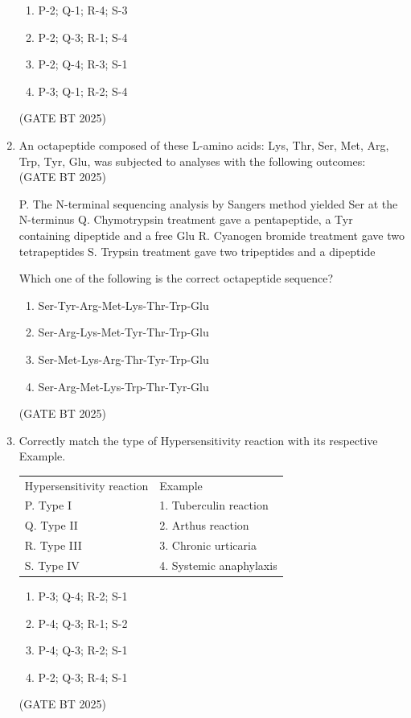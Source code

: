 \documentclass[journal,12pt,onecolumn]{IEEEtran}
\theoremstyle{remark}
\begin{document}
\begin{enumerate}
\begin{enumerate}
    \item P-2; Q-1; R-4; S-3
    \item P-2; Q-3; R-1; S-4
    \item P-2; Q-4; R-3; S-1
    \item P-3; Q-1; R-2; S-4
\end{enumerate}  
\hfill (GATE BT 2025)


\item An octapeptide composed of these L-amino acids: Lys, Thr, Ser, Met, Arg, Trp, Tyr, Glu, was subjected to analyses with the following outcomes:  
\hfill (GATE BT 2025)


P. The N-terminal sequencing analysis by Sangers method yielded Ser at the N-terminus  
Q. Chymotrypsin treatment gave a pentapeptide, a 
Tyr containing dipeptide and a free Glu  
R. Cyanogen bromide treatment gave two tetrapeptides  
S. Trypsin treatment gave two tripeptides and a dipeptide  

Which one of the following is the correct octapeptide sequence?  

\begin{enumerate}
    \item Ser-Tyr-Arg-Met-Lys-Thr-Trp-Glu
    \item Ser-Arg-Lys-Met-Tyr-Thr-Trp-Glu
    \item Ser-Met-Lys-Arg-Thr-Tyr-Trp-Glu
    \item Ser-Arg-Met-Lys-Trp-Thr-Tyr-Glu
\end{enumerate}  
\hfill (GATE BT 2025)

\item Correctly match the type of Hypersensitivity reaction with its respective Example.  

\begin{tabular}{ll}
Hypersensitivity reaction & Example \\
P. Type I & 1. Tuberculin reaction \\
Q. Type II & 2. Arthus reaction \\
R. Type III & 3. Chronic urticaria \\
S. Type IV & 4. Systemic anaphylaxis
\end{tabular}  

\begin{enumerate}
    \item P-3; Q-4; R-2; S-1
    \item P-4; Q-3; R-1; S-2
    \item P-4; Q-3; R-2; S-1
    \item P-2; Q-3; R-4; S-1
\end{enumerate}  
\hfill (GATE BT 2025)


\end{enumerate}
\end{document}
